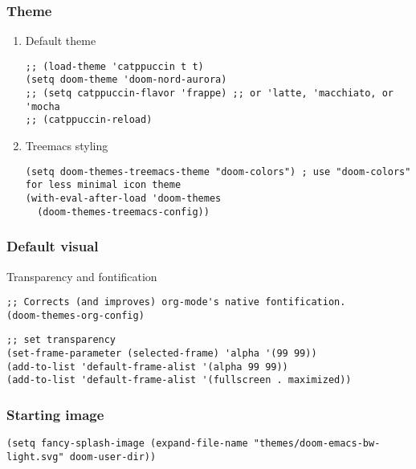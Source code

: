 \documentclass[c]{article}
\theoremstyle{plain}%
\theoremstyle{definition}
\theoremstyle{remark}
\begin{document}
\subsubsection{Theme}
\label{sec:org4327363}
\begin{enumerate}
\item Default theme
\label{sec:org30404bb}
\begin{verbatim}
;; (load-theme 'catppuccin t t)
(setq doom-theme 'doom-nord-aurora)
;; (setq catppuccin-flavor 'frappe) ;; or 'latte, 'macchiato, or 'mocha
;; (catppuccin-reload)
\end{verbatim}
\item Treemacs styling
\label{sec:orgd049d6c}
\begin{verbatim}
(setq doom-themes-treemacs-theme "doom-colors") ; use "doom-colors" for less minimal icon theme
(with-eval-after-load 'doom-themes
  (doom-themes-treemacs-config))
\end{verbatim}
\end{enumerate}
\subsubsection{Default visual}
\label{sec:orge83210b}
Transparency and fontification
\begin{verbatim}
;; Corrects (and improves) org-mode's native fontification.
(doom-themes-org-config)
\end{verbatim}
\begin{verbatim}
;; set transparency
(set-frame-parameter (selected-frame) 'alpha '(99 99))
(add-to-list 'default-frame-alist '(alpha 99 99))
(add-to-list 'default-frame-alist '(fullscreen . maximized))
\end{verbatim}
\subsubsection{Starting image}
\label{sec:orgec1edf6}
\begin{verbatim}
(setq fancy-splash-image (expand-file-name "themes/doom-emacs-bw-light.svg" doom-user-dir))
\end{verbatim}
\end{document}
